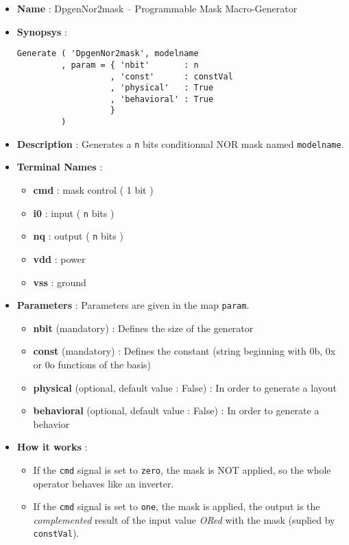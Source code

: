 \begin{itemize}
    \item \textbf{Name} : DpgenNor2mask -- Programmable Mask Macro-Generator
    \item \textbf{Synopsys} :
\begin{verbatim}
Generate ( 'DpgenNor2mask', modelname
         , param = { 'nbit'       : n
                   , 'const'      : constVal 
                   , 'physical'   : True
                   , 'behavioral' : True                   
                   }
         )
\end{verbatim}
    \item \textbf{Description} : Generates a \verb-n- bits conditionnal NOR mask named \verb-modelname-.
    \item \textbf{Terminal Names} :
    \begin{itemize}
        \item \textbf{cmd} : mask control ( 1 bit )
        \item \textbf{i0} : input ( \verb-n- bits )
        \item \textbf{nq} : output ( \verb-n- bits )
        \item \textbf{vdd} : power
        \item \textbf{vss} : ground
    \end{itemize}
    \item \textbf{Parameters} : Parameters are given in the map \verb-param-.
    \begin{itemize}
        \item \textbf{nbit} (mandatory) : Defines the size of the generator
        \item \textbf{const} (mandatory) : Defines the constant (string beginning with 0b, 0x or 0o functions of the basis)
        \item \textbf{physical} (optional, default value : False) : In order to generate a layout
        \item \textbf{behavioral} (optional, default value : False) : In order to generate a behavior        
    \end{itemize}
    \item \textbf{How it works} :
    \begin{itemize}
        \item If the \verb-cmd- signal is set to \verb-zero-, the mask is NOT applied, so the whole operator behaves like an inverter.
        \item If the \verb-cmd- signal is set to \verb-one-, the mask is applied, the output is the \emph{complemented} result of the input value \emph{ORed} with the mask (suplied by \verb-constVal-).

\end{itemize}
\end{itemize}
